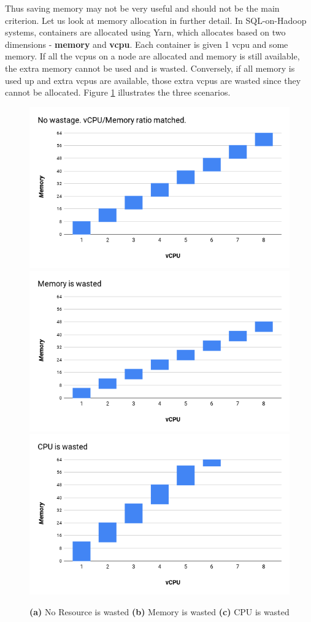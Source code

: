 Thus saving memory may not be very useful and should not be the main criterion. Let us look at memory allocation in further detail. In SQL-on-Hadoop systems, containers are allocated using Yarn, which allocates based on two dimensions - \textbf{memory} and \textbf{vcpu}. Each container is given 1 vcpu and some memory. If all the vcpus on a node are allocated and memory is still available, the extra memory cannot be used and is wasted. Conversely, if all memory is used up and extra vcpus are available, those extra vcpus are wasted since they cannot be allocated. 
Figure \ref{fig:container_shape} illustrates the three scenarios.
\begin{figure}[h]
	\includegraphics[width=0.3\linewidth]{container_shape1.png} 
	\includegraphics[width=0.3\linewidth]{container_shape2.png}
	\includegraphics[width=0.3\linewidth]{container_shape3.png}
	\caption{\textbf{(a)} No Resource is wasted \textbf{(b)} Memory is wasted \textbf{(c)} CPU is wasted}
	\label{fig:container_shape}
\end{figure}
